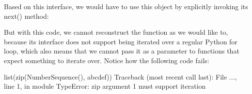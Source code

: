 \documentclass[a4paper,10pt,english]{sphinxmanual}
\begin{document}
\begin{sphinxVerbatim}[commandchars=\\\{\}]
 
      
          

     
          
          
         
\end{sphinxVerbatim}

Based on this interface, we would have to use this object by explicitly invoking its next()
method:

\begin{sphinxVerbatim}[commandchars=\\\{\}]
  
  
\end{sphinxVerbatim}

But with this code, we cannot reconstruct the  function as we would like to,
because its interface does not support being iterated over a regular Python for loop, which
also means that we cannot pass it as a parameter to functions that expect something to
iterate over. Notice how the following code fails:

\begin{sphinxVerbatim}[commandchars=\\\{\}]
\PYGZgt{}\PYGZgt{}\PYGZgt{} list(zip(NumberSequence(), \PYGZdq{}abcdef\PYGZdq{}))
Traceback (most recent call last):
File \PYGZdq{}...\PYGZdq{}, line 1, in \PYGZlt{}module\PYGZgt{}
TypeError: zip argument \PYGZsh{}1 must support iteration
\end{sphinxVerbatim}
\end{document}
